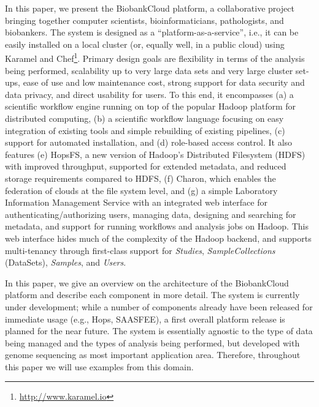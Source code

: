 In this paper, we present the BiobankCloud platform, a collaborative project bringing together computer scientists, bioinformaticians, pathologists, and biobankers. The system is designed as a ``platform-as-a-service'', i.e., it can be easily installed on a local cluster (or, equally well, in a public cloud) using Karamel and Chef\footnote{\url{http://www.karamel.io}}. Primary design goals are flexibility in terms of the analysis being performed, scalability up to very large data sets and very large cluster set-ups, ease of use and low maintenance cost, strong support for data security and data privacy, and direct usability for users. To this end, it encompasses (a) a scientific workflow engine running on top of the popular Hadoop platform for distributed computing, (b) a scientific workflow language focusing on easy integration of existing tools and simple rebuilding of existing pipelines, (c) support for automated installation, and (d) role-based access control. It also features (e) HopsFS, a new version of Hadoop's Distributed Filesystem (HDFS) with improved throughput, supported for extended metadata, and reduced storage requirements compared to HDFS, (f) Charon, which enables the federation of clouds at the file system level, and (g) a simple Laboratory Information Management Service with an integrated web interface for authenticating/authorizing users, managing data, designing and searching for metadata, and support for running workflows and analysis jobs on Hadoop. This web interface hides much of the complexity of the Hadoop backend, and supports multi-tenancy through first-class support for \textit{Studies}, \textit{SampleCollections} (DataSets), \textit{Samples}, and \textit{Users}. 

In this paper, we give an overview on the architecture of the BiobankCloud platform and describe each component in more detail. The system is currently under development; while a number of components already have been released for immediate usage (e.g., Hops, SAASFEE), a first overall platform release is planned for the near future. The system is essentially agnostic to the type of data being managed and the types of analysis being performed, but developed with genome sequencing as most important application area. Therefore, throughout this paper we will use examples from this domain. 
